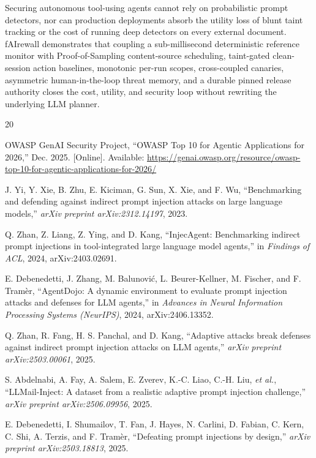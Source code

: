 \documentclass[conference]{IEEEtran}
\begin{document}
Securing autonomous tool-using agents cannot rely on probabilistic prompt detectors, nor can production deployments absorb the utility loss of blunt taint tracking or the cost of running deep detectors on every external document. fAIrewall demonstrates that coupling a sub-millisecond deterministic reference monitor with Proof-of-Sampling content-source scheduling, taint-gated clean-session action baselines, monotonic per-run scopes, cross-coupled canaries, asymmetric human-in-the-loop threat memory, and a durable pinned release authority closes the cost, utility, and security loop without rewriting the underlying LLM planner.

\begin{thebibliography}{20}

OWASP GenAI Security Project, ``OWASP Top 10 for Agentic Applications for 2026,'' Dec. 2025. [Online]. Available: \url{https://genai.owasp.org/resource/owasp-top-10-for-agentic-applications-for-2026/}

J. Yi, Y. Xie, B. Zhu, E. Kiciman, G. Sun, X. Xie, and F. Wu, ``Benchmarking and defending against indirect prompt injection attacks on large language models,'' \emph{arXiv preprint arXiv:2312.14197}, 2023.

Q. Zhan, Z. Liang, Z. Ying, and D. Kang, ``InjecAgent: Benchmarking indirect prompt injections in tool-integrated large language model agents,'' in \emph{Findings of ACL}, 2024, arXiv:2403.02691.

E. Debenedetti, J. Zhang, M. Balunovi{\'c}, L. Beurer-Kellner, M. Fischer, and F. Tram{\`e}r, ``AgentDojo: A dynamic environment to evaluate prompt injection attacks and defenses for LLM agents,'' in \emph{Advances in Neural Information Processing Systems (NeurIPS)}, 2024, arXiv:2406.13352.

Q. Zhan, R. Fang, H. S. Panchal, and D. Kang, ``Adaptive attacks break defenses against indirect prompt injection attacks on LLM agents,'' \emph{arXiv preprint arXiv:2503.00061}, 2025.

S. Abdelnabi, A. Fay, A. Salem, E. Zverev, K.-C. Liao, C.-H. Liu, \emph{et al.}, ``LLMail-Inject: A dataset from a realistic adaptive prompt injection challenge,'' \emph{arXiv preprint arXiv:2506.09956}, 2025.

E. Debenedetti, I. Shumailov, T. Fan, J. Hayes, N. Carlini, D. Fabian, C. Kern, C. Shi, A. Terzis, and F. Tram{\`e}r, ``Defeating prompt injections by design,'' \emph{arXiv preprint arXiv:2503.18813}, 2025.


\end{thebibliography}
\end{document}

